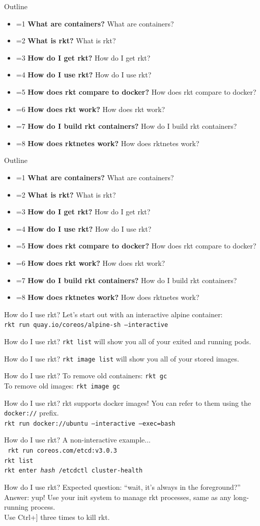 \documentclass[pdf,aspectratio=169,14pt]{beamer}
\newcommand{\mbold}[3]{
    \ifnum #1=#2
        \textbf{#3}
    \else
        #3
    \fi
}
\newcommand{\outline}[1]{
    \begin{frame}
        Outline
        \begin{itemize}
            \item \mbold{#1}{1}{What are containers?}
            \item \mbold{#1}{2}{What is rkt?}
            \item \mbold{#1}{3}{How do I get rkt?}
            \item \mbold{#1}{4}{How do I use rkt?}
            \item \mbold{#1}{5}{How does rkt compare to docker?}
            \item \mbold{#1}{6}{How does rkt work?}
            \item \mbold{#1}{7}{How do I build rkt containers?}
            \item \mbold{#1}{8}{How does rktnetes work?}
        \end{itemize}
    \end{frame}
}
\begin{document}

\outline{3}
\outline{4}

\begin{frame}{How do I use rkt?}
    Let's start out with an interactive alpine container: \\
    \texttt{rkt run quay.io/coreos/alpine-sh --interactive}
\end{frame}

\begin{frame}{How do I use rkt?}
    \texttt{rkt list} will show you all of your exited and running pods.
\end{frame}

\begin{frame}{How do I use rkt?}
    \texttt{rkt image list} will show you all of your stored images.
\end{frame}

\begin{frame}{How do I use rkt?}
    To remove old containers: \texttt{rkt gc} \\
    To remove old images: \texttt{rkt image gc}
\end{frame}

\begin{frame}{How do I use rkt?}
    rkt supports docker images! You can refer to them using the
    \texttt{docker://} prefix. \\
    \vspace{1em}
    \texttt{rkt run docker://ubuntu --interactive --exec=bash} 
\end{frame}

\begin{frame}{How do I use rkt?}
    A non-interactive example... \\
    \vspace{1em}
    \texttt{\noindent
        rkt run coreos.com/etcd:v3.0.3 \\
        rkt list \\
        rkt enter \textit{hash} /etcdctl cluster-health
    }
\end{frame}

\begin{frame}{How do I use rkt?}
    Expected question: ``wait, it's always in the foreground?'' \\
    \pause
    \vspace{1em}
    Answer: yup! Use your init system to manage rkt processes, same as any
    long-running process. \\
    Use Ctrl+] three times to kill rkt.
\end{frame}
\end{document}
